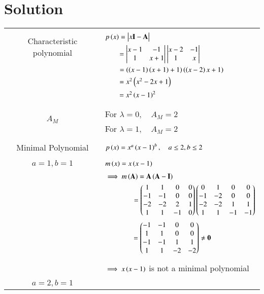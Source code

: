 \documentclass[journal,12pt]{IEEEtran}
\begin{document}
\section{\textbf{Solution}}
\renewcommand{\thetable}{2}
\begin{longtable}{|c|l|}
    \hline
	\multirow{3}{*}{Characteristic polynomial} 
	& \\
	& $p\brak{x}=\mydet{x\Vec{I}-\Vec{A}}$\\
	& $\qquad = \begin{vmatrix}x-1&-1\\1&x+1\end{vmatrix}\begin{vmatrix}x-2&-1\\1&x\end{vmatrix}$\\
	& $\qquad=\left(\left(x-1\right)\left(x+1\right)+1\right)\left(\left(x-2\right)x+1\right)$\\
	&$\qquad=x^2\left(x^2-2x+1\right)$\\
	&$\qquad=x^2\left(x-1\right)^2$\\
	&\\
	\hline
	\multirow{3}{*}{$A_M$} 
	&\\
	& For $\lambda=0,\quad A_M=2$\\
	& For $\lambda=1,\quad A_M=2$\\
	&\\
	\hline
	\multirow{3}{*}{Minimal Polynomial} & \\
	& $p\left(x\right)=x^a\left(x-1\right)^b,\quad a\leq2, b\leq2$\\
	&\\
	\hline
	\multirow{3}{*}{$a=1,b=1$} & \\
	&$m\left(x\right)=x\left(x-1\right)$\\
	&\\
	& $\implies m\brak{\vec{A}}=\vec{A}\brak{\Vec{A}-\vec{I}}$\\
	& $\qquad\qquad=\begin{pmatrix}1&1&0&0\\-1&-1&0&0\\-2&-2&2&1\\1&1&-1&0\end{pmatrix}\begin{pmatrix}0&1&0&0\\-1&-2&0&0\\-2&-2&1&1\\1&1&-1&-1\end{pmatrix}$\\
	& $\qquad \qquad = \myvec{-1&-1&0&0\\1&1&0&0\\-1&-1&1&1\\1&1&-2&-2}\neq\Vec{0}$\\
	&\\
	& $\implies x\left(x-1\right)$ is not a minimal polynomial\\
	&\\
	\hline
	\multirow{3}{*}{$a=2,b=1$} & \\

\end{longtable}
\end{document}

